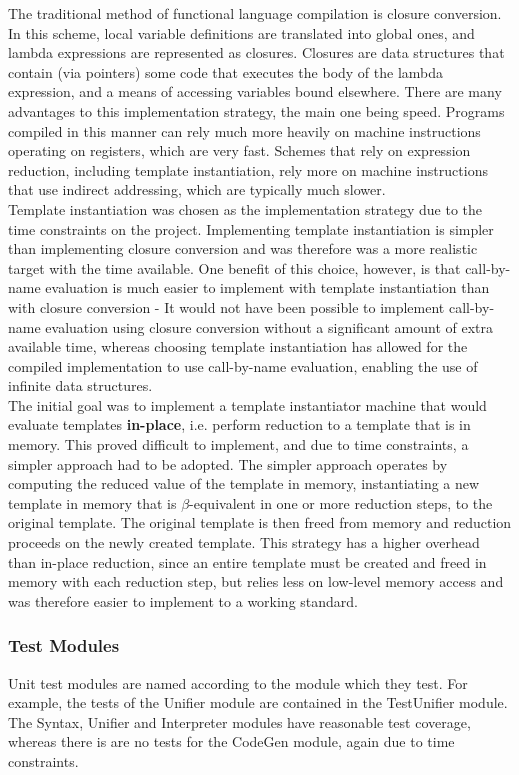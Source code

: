 \documentclass{article}
\begin{document}
The traditional method of functional language compilation is closure conversion. In this scheme, local variable definitions are translated into global ones, and lambda expressions are represented as closures. Closures are data structures that contain (via pointers) some code that executes the body of the lambda expression, and a means of accessing variables bound elsewhere. There are many advantages to this implementation strategy, the main one being speed. Programs compiled in this manner can rely much more heavily on machine instructions operating on registers, which are very fast. Schemes that rely on expression reduction, including template instantiation, rely more on machine instructions that use indirect addressing, which are typically much slower.
\\\indent Template instantiation was chosen as the implementation strategy due to the time constraints on the project. Implementing template instantiation is simpler than implementing closure conversion and was therefore was a more realistic target with the time available. One benefit of this choice, however, is that call-by-name evaluation is much easier to implement with template instantiation than with closure conversion - It would not have been possible to implement call-by-name evaluation using closure conversion without a significant amount of extra available time, whereas choosing template instantiation has allowed for the compiled implementation to use call-by-name evaluation, enabling the use of infinite data structures.
\\\indent The initial goal was to implement a template instantiator machine that would evaluate templates \textbf{in-place}, i.e. perform reduction to a template that is in memory. This proved difficult to implement, and due to time constraints, a simpler approach had to be adopted. The simpler approach operates by computing the reduced value of the template in memory, instantiating a new template in memory that is $\beta$-equivalent in one or more reduction steps, to the original template. The original template is then freed from memory and reduction proceeds on the newly created template. This strategy has a higher overhead than in-place reduction, since an entire template must be created and freed in memory with each reduction step, but relies less on low-level memory access and was therefore easier to implement to a working standard.
\subsubsection{Test Modules}
Unit test modules are named according to the module which they test. For example, the tests of the Unifier module are contained in the TestUnifier module. The Syntax, Unifier and Interpreter modules have reasonable test coverage, whereas there is are no tests for the CodeGen module, again due to time constraints.
\end{document}
